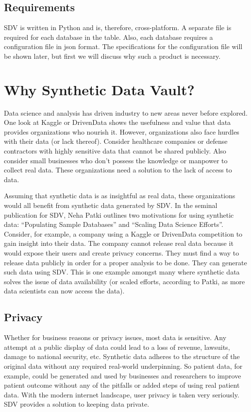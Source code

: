 \subsection{Requirements}

SDV is written in Python and is, therefore, cross-platform. A separate file
is required for each database in the table. Also, each database requires a
configuration file in json format. The specifications for the configuration
file will be shown later, but first we will discuss why such a product is
necessary.\cite{hid-sp18-526-www-sdv-github}

\section{Why Synthetic Data Vault?}

Data science and analysis has driven industry to new areas never before
explored. One look at Kaggle or DrivenData shows the usefulness and value
that data provides organizations who nourish it. However, organizations
also face hurdles with their data (or lack thereof). Consider healthcare
companies or defense contractors with highly sensitive data that cannot
be shared publicly. Also consider small businesses who don't possess the
knowledge or manpower to collect real data. These organizations need a
solution to the lack of access to data.

Assuming that synthetic data is as insightful as real data, these
organizations would all benefit from synthetic data generated by SDV. In
the seminal publication for SDV, Neha Patki outlines two motivations for
using synthetic data: ``Populating Sample Databases'' and ``Scaling Data
Science Efforts''\cite{hid-sp18-526-patki-sdv}. Consider, for example, a company using
a Kaggle or DrivenData competition to gain insight into their data. The
company cannot release real data because it would expose their users and
create privacy concerns. They must find a way to release data publicly in
order for a proper analysis to be done. They can generate such data using
SDV. This is one example amongst many where synthetic data solves the issue
of data availability (or scaled efforts, according to Patki, as more data
scientists can now access the data).

\subsection{Privacy}

Whether for business reasons or privacy issues, most data is sensitive. Any
attempt at a public display of data could lead to a loss of revenue, lawsuits,
damage to national security, etc. Synthetic data adheres to the structure of
the original data without any required real-world underpinning. So patient
data, for example, could be generated and used by businesses and researchers
to improve patient outcome without any of the pitfalls or added steps of
using real patient data. With the modern internet landscape, user privacy
is taken very seriously. SDV provides a solution to keeping data private.

